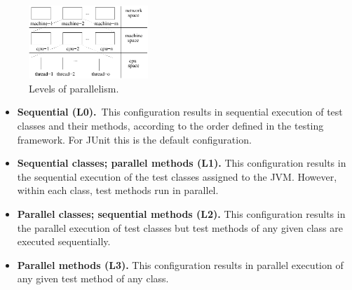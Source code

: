 \begin{figure}[t!]
  \centering
  \includegraphics[width=0.4\textwidth]{figs/parallel-levels.pdf}
  \caption{\label{fig:levels}Levels of parallelism.}
\end{figure}

\newcommand{\Seq}{L0}
\newcommand{\ParClassSeqMeth}{L1}
\newcommand{\SeqClassParMeth}{L2}
\newcommand{\ParClassParMeth}{L3}

\begin{itemize}
\item \textbf{Sequential (\Seq).}~This configuration results in
  sequential execution of test classes and their methods, according to
  the order defined in the testing framework.  For JUnit
  this is the default configuration.
\item \textbf{Sequential classes; parallel methods
  (\ParClassSeqMeth{}).} This configuration results in the sequential
  execution of the test classes assigned to the JVM.  However, within
  each class, test methods run in parallel.
\item \textbf{Parallel classes; sequential methods
  (\SeqClassParMeth{}).}  This configuration results in the parallel
  execution of test classes but test methods of any given class are
  executed sequentially.
\item \textbf{Parallel methods (\ParClassParMeth).} This configuration
  results in parallel execution of any given test method of any class.
\end{itemize}

